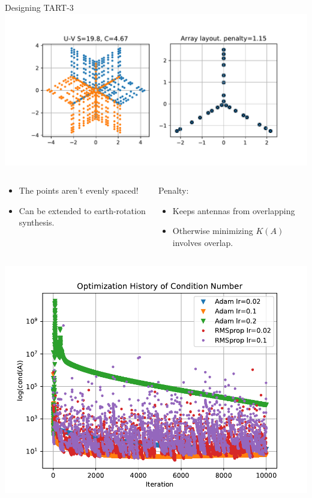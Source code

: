 \documentclass[ignorenonframetext]{beamer}
\begin{document}
\begin{frame}{Designing TART-3}
   \includegraphics[width=\linewidth]{fig/optimum_tart_array.pdf}
 \begin{columns}
  \begin{column}{0.5\linewidth}
  \begin{itemize}
   \item The points aren't evenly spaced!
   \item Can be extended to earth-rotation synthesis.
  \end{itemize}
  \end{column}
  \begin{column}{0.5\linewidth}
  Penalty:
  \begin{itemize}
   \item Keeps antennas from overlapping
   \item Otherwise minimizing $K(A)$ involves overlap.
  \end{itemize}
  \end{column}
 \end{columns}

\end{frame}

\begin{frame}
    \includegraphics[width=\linewidth]{fig/optimization_history.pdf}
\end{frame}
\end{document}
